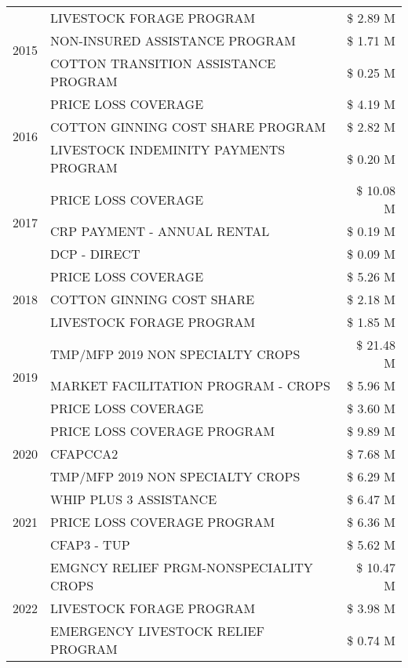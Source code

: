 \begin{tabular}{llr}
\cline{1-3}
\multirow[t]{3}{*}{2015} & LIVESTOCK FORAGE PROGRAM & \$ 2.89 M \\
 & NON-INSURED ASSISTANCE PROGRAM & \$ 1.71 M \\
 & COTTON TRANSITION ASSISTANCE PROGRAM & \$ 0.25 M \\
\cline{1-3}
\multirow[t]{3}{*}{2016} & PRICE LOSS COVERAGE & \$ 4.19 M \\
 & COTTON GINNING COST SHARE PROGRAM & \$ 2.82 M \\
 & LIVESTOCK INDEMINITY PAYMENTS PROGRAM & \$ 0.20 M \\
\cline{1-3}
\multirow[t]{3}{*}{2017} & PRICE LOSS COVERAGE & \$ 10.08 M \\
 & CRP PAYMENT - ANNUAL RENTAL & \$ 0.19 M \\
 & DCP - DIRECT & \$ 0.09 M \\
\cline{1-3}
\multirow[t]{3}{*}{2018} & PRICE LOSS COVERAGE & \$ 5.26 M \\
 & COTTON GINNING COST SHARE & \$ 2.18 M \\
 & LIVESTOCK FORAGE PROGRAM & \$ 1.85 M \\
\cline{1-3}
\multirow[t]{3}{*}{2019} & TMP/MFP 2019 NON SPECIALTY CROPS & \$ 21.48 M \\
 & MARKET FACILITATION PROGRAM - CROPS & \$ 5.96 M \\
 & PRICE LOSS COVERAGE & \$ 3.60 M \\
\cline{1-3}
\multirow[t]{3}{*}{2020} & PRICE LOSS COVERAGE PROGRAM & \$ 9.89 M \\
 & CFAPCCA2 & \$ 7.68 M \\
 & TMP/MFP 2019 NON SPECIALTY CROPS & \$ 6.29 M \\
\cline{1-3}
\multirow[t]{3}{*}{2021} & WHIP PLUS 3 ASSISTANCE & \$ 6.47 M \\
 & PRICE LOSS COVERAGE PROGRAM & \$ 6.36 M \\
 & CFAP3 - TUP & \$ 5.62 M \\
\cline{1-3}
\multirow[t]{3}{*}{2022} & EMGNCY RELIEF PRGM-NONSPECIALITY CROPS & \$ 10.47 M \\
 & LIVESTOCK FORAGE PROGRAM & \$ 3.98 M \\
 & EMERGENCY LIVESTOCK RELIEF PROGRAM & \$ 0.74 M \\
\cline{1-3}
\bottomrule
\end{tabular}
